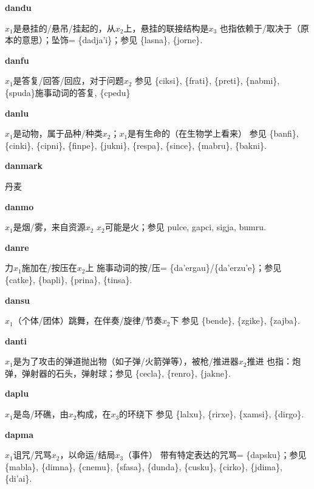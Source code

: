 \documentclass[notitlepage,twocolumn,a4paper,10pt]{book}
\begin{document}
{\sffamily\bfseries dandu}\enspace {\ttfamily\bfseries[dad]}  $x_1$是悬挂的\slash{}悬吊\slash{}挂起的，从$x_2$上，悬挂的联接结构是$x_3$ \textemdash{} 也指依赖于\slash{}取决于（原本的意思）；坠饰= \{dadja'i\}；参见 \{lasna\}, \{jorne\}.

{\sffamily\bfseries danfu}\enspace {\ttfamily\bfseries[daf]}  $x_1$是答复\slash{}回答\slash{}回应，对于问题$x_2$ \textemdash{} 参见 \{ciksi\}, \{frati\}, \{preti\}, \{nabmi\}, \{spuda\}施事动词的答复, \{cpedu\}

{\sffamily\bfseries danlu}\enspace {\ttfamily\bfseries[dal     da'u]}  $x_1$是动物，属于品种\slash{}种类$x_2$；$x_1$是有生命的（在生物学上看来） \textemdash{} 参见 \{banfi\}, \{cinki\}, \{cipni\}, \{finpe\}, \{jukni\}, \{respa\}, \{since\}, \{mabru\}, \{bakni\}.

{\sffamily\bfseries danmark} 丹麦

{\sffamily\bfseries danmo}\enspace {\ttfamily\bfseries[dam]}  $x_1$是烟\slash{}雾，来自资源$x_2$ \textemdash{} $x_2$可能是火；参见 {pulce}, {gapci}, {sigja}, {bumru}.

{\sffamily\bfseries danre}\enspace {\ttfamily\bfseries[        da'e]}  力$x_1$施加在\slash{}按压在$x_2$上 \textemdash{} 施事动词的按\slash{}压= \{da'ergau\}\slash{}\{da'erzu'e\}；参见 \{catke\}, \{bapli\}, \{prina\}, \{tinsa\}.

{\sffamily\bfseries dansu} $x_1$（个体\slash{}团体）跳舞，在伴奏\slash{}旋律\slash{}节奏$x_2$下 \textemdash{} 参见 \{bende\}, \{zgike\}, \{zajba\}.

{\sffamily\bfseries danti}\enspace {\ttfamily\bfseries[dan]}  $x_1$是为了攻击的弹道抛出物（如子弹\slash{}火箭弹等），被枪\slash{}推进器$x_2$推进 \textemdash{} 也指：炮弹，弹射器的石头，弹射球；参见 \{cecla\}, \{renro\}, \{jakne\}.

{\sffamily\bfseries daplu}\enspace {\ttfamily\bfseries[    plu]}  $x_1$是岛\slash{}环礁，由$x_2$构成，在$x_3$的环绕下 \textemdash{} 参见 \{lalxu\}, \{rirxe\}, \{xamsi\}, \{dirgo\}.

{\sffamily\bfseries dapma}\enspace {\ttfamily\bfseries[dap]}  $x_1$诅咒\slash{}咒骂$x_2$，以命运\slash{}结局$x_3$（事件） \textemdash{} 带有特定表达的咒骂= \{dapsku\}；参见 \{mabla\}, \{dimna\}, \{cnemu\}, \{sfasa\}, \{dunda\}, \{cusku\}, \{cirko\}, \{jdima\}, \{di'ai\}.
\end{document}
